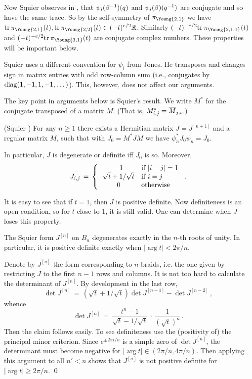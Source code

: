 Now Squier observes in \cite{Squier}, that $\psi_i(\beta^{-1})(q)$
and $\psi_i(\beta)(q^{-1})$ are conjugate and so have the same
trace. So by the self-symmetry of $\pi_{\Young{2,1}}$ we have
$\tr \pi_{\Young{2,1}}(t), \tr \pi_{\Young{2,2}}(t)\in (-t)^{e/2}\bR$.
Similarly $(-t)^{-e/2}\tr \pi_{\Young{2,1,1}}(t)$ and $(-t)^{-e/2}\tr
\pi_{\Young{3,1}}(t)$ are conjugate complex numbers. 
These properties will be important below.

\begin{rem}
Squier uses a different convention for
$\psi_i$ from Jones. He transposes and changes sign in
matrix entries with odd row-column sum (i.e., conjugates by
$\dig(1,-1,1,-1,\dots)$). This, however, does not affect
our arguments. 
\end{rem}

The key point in arguments below is Squier's result.
We write $M^*$ for the conjugate transposed of a matrix $M$.
(That is, $M^*_{i,j}=\overline{M}_{j,i}$.)

\begin{theorem}(Squier \cite{Squier})
For any $n\ge 1$ there exists a Hermitian matrix $J=J^{[n+1]}$ and a
regular matrix $M$, such that with $J_0=M^*JM$ we have $\psi_n^*J_0
\psi_n=J_0$.
\end{theorem}

In particular, $J$ is degenerate or definite iff $J_0$ is so.
Moreover,
\[
J_{i,j}\,=\,\left\{\,\begin{array}{c@{\quad}l}
-1 & \mbox {if\ $|i-j|=1$} \\
\sqrt{t}+1/\sqrt{t} & \mbox {if\ $i=j$} \\
0 & \mbox {otherwise}
\end{array}\right.\,.
\]

It is easy to see that if $t=1$, then $J$ is positive definite.
Now definiteness is an open condition, so for $t$ close to $1$,
it is still valid. 
One can determine when $J$ loses this
property. %

\begin{prop}\label{p4.1}
The Squier form $J^{[n]}$ on $B_n$ degenerates exactly in the $n$-th
roots of unity. In particular, it is positive definite exactly
when $|\arg t|<2\pi /n$.
\end{prop}

\proof Denote by $J^{[n]}$ the form corresponding to $n$-braids,
i.e. the one given by restricting $J$ to the first $n-1$
rows and columns. It is not too hard to calculate the determinant
of $J^{[n]}$. By development in the last row,
\[
\det J^{[n]}\,=\,(\sqrt{t}+1/\sqrt{t})\det J^{[n-1]}-\det J^{[n-2]}\,,
\]
whence
\[
\det J^{[n]}\,=\,\frac{t^n-1}{\sqrt{t}-1/\sqrt{t}}\,\cdot\,
\frac{1}{(\sqrt{t})^n}\,.
\]
Then the claim follows easily. To see definiteness use the
(positivity of) the principal minor criterion. Since $e^{\pm 2\pi i/n}$
is a simple zero of $\det J^{[n]}$, the determinant must become
negative for $|\arg t|\in(2\pi/n,4\pi/n)$. Then applying this
argument to all $n'<n$ shows that $J^{[n]}$ is not positive definite
for $|\arg t|\ge 2\pi/n$. \qed


